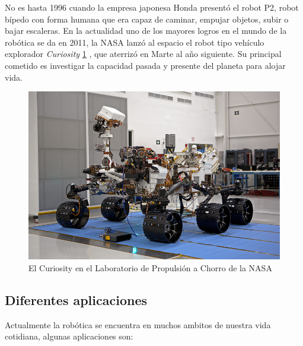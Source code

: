 No es hasta 1996 cuando la empresa japonesa Honda presentó el robot P2, robot bípedo con forma humana que era capaz de caminar, empujar objetos, subir o bajar escaleras.
En la actualidad uno de los mayores logros en el mundo de la robótica se da en 2011, la NASA lanzó al espacio el robot tipo vehículo explorador \textit{Curiosity} \ref{fig:curiosity} , que aterrizó en Marte al año siguiente. Su principal cometido es investigar la capacidad pasada y presente del planeta para alojar vida.

\begin{figure}[!ht]
    \centering
    \includegraphics[scale=0.75]{img/curiosity.jpg}
  	\caption{El Curiosity en el Laboratorio de Propulsión a Chorro de la NASA}
  	\label{fig:curiosity}
\end{figure}

\subsection{Diferentes aplicaciones}
\label{subsec:diferentes aplicaciones}

Actualmente la robótica se encuentra en muchos ambitos de nuestra vida cotidiana, algunas aplicaciones son:

